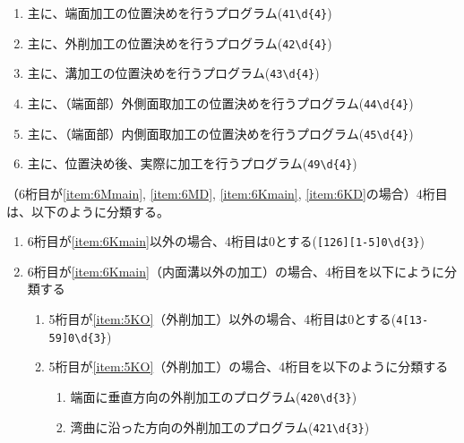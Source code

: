 \begin{enumerate}[label=\alph*)]
\begin{enumerate}[label=\arabic*., ref=\arabic*, start=1]
  \item\label{item:5KF} 主に、端面加工の位置決めを行うプログラム(\verb|41\d{4}|)
  \item\label{item:5KO} 主に、外削加工の位置決めを行うプログラム(\verb|42\d{4}|)
  \item\label{item:5KK} 主に、溝加工の位置決めを行うプログラム(\verb|43\d{4}|)
  \item\label{item:5KCO} 主に、（端面部）外側面取加工の位置決めを行うプログラム(\verb|44\d{4}|)
  \item\label{item:5KCI} 主に、（端面部）内側面取加工の位置決めを行うプログラム(\verb|45\d{4}|)
\setcounter{enumii}{8}
  \item 主に、位置決め後、実際に加工を行うプログラム(\verb|49\d{4}|)
  \end{enumerate}
\end{enumerate}


（6桁目が\ref{item:6Mmain}, \ref{item:6MD}, \ref{item:6Kmain}, \ref{item:6KD}の場合）4桁目は、以下のように分類する。
\begin{enumerate}[label=\alph*), ref=\alph*)]
\item 6桁目が\ref{item:6Kmain}\hx 以外の場合、4桁目は0とする(\verb|[126][1-5]0\d{3}|)
\item 6桁目が\ref{item:6Kmain}（内面溝以外の加工）の場合、4桁目を以下にように分類する
  \begin{enumerate}[label=\alph{enumi}\,-\arabic*), leftmargin=\leftmargini]
  \item 5桁目が\ref{item:5KO}（外削加工）以外の場合、4桁目は0とする(\verb|4[13-59]0\d{3}|)
  \item 5桁目が\ref{item:5KO}（外削加工）の場合、4桁目を以下のように分類する
    \begin{enumerate}[label=\arabic*., ref=\arabic*, start=0, leftmargin=*]
    \item 端面に垂直方向の外削加工のプログラム(\verb|420\d{3}|)
    \item 湾曲に沿った方向の外削加工のプログラム(\verb|421\d{3}|)
    \end{enumerate}
  \end{enumerate}
\end{enumerate}



